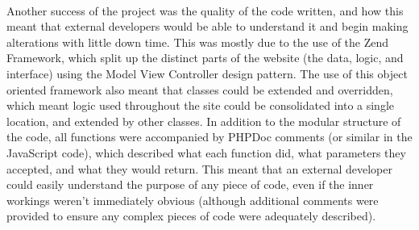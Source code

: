 \ \\
Another success of the project was the quality of the code written, and how this meant that external developers would be able to understand it and begin making alterations with little down time. This was mostly due to the use of the Zend Framework, which split up the distinct parts of the website (the data, logic, and interface) using the Model View Controller design pattern. The use of this object oriented framework also meant that classes could be extended and overridden, which meant logic used throughout the site could be consolidated into a single location, and extended by other classes. In addition to the modular structure of the code, all functions were accompanied by PHPDoc comments (or similar in the JavaScript code), which described what each function did, what parameters they accepted, and what they would return. This meant that an external developer could easily understand the purpose of any piece of code, even if the inner workings weren't immediately obvious (although additional comments were provided to ensure any complex pieces of code were adequately described). 

